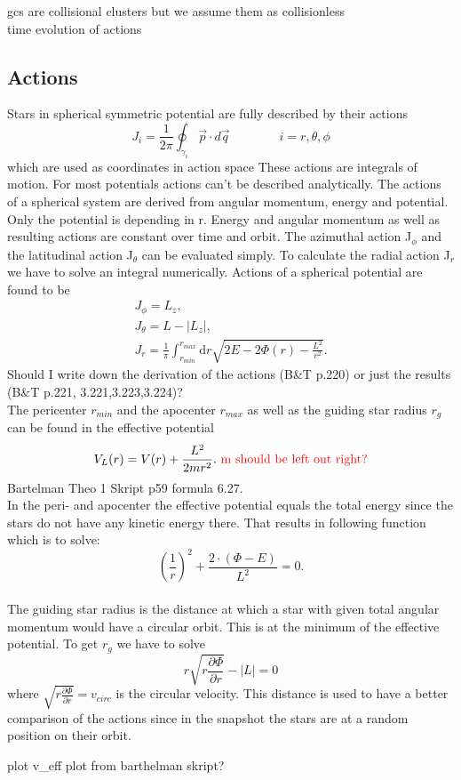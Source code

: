 \color{red} gcs are collisional clusters but we assume them as collisionless \\ time evolution of actions \color{black}


\subsection{Actions}
Stars in spherical symmetric potential are fully described by their actions \begin{equation}
J_i=\frac{1}{2\pi}\oint_{\gamma_i}\vec{p}\cdot d\vec{q} \qquad\qquad i=r,\theta,\phi
\end{equation} which are used as coordinates in action space
These actions are integrals of motion. For most potentials actions can't be described analytically. The actions of a spherical system are derived from angular momentum, energy and potential. Only the potential is depending in r. Energy and angular momentum as well as resulting actions are constant over time and orbit. The azimuthal action J\(_\phi\) and the latitudinal action J\(_\theta\) can be evaluated simply. To calculate the radial action J\(_r\) we have to solve an integral numerically. Actions of a spherical potential are found to be \begin{align}
J_\phi=L_z, \\ J_\theta=L-|L_z|, \\ J_r=\frac{1}{\pi} \int_{r_{min}}^{r_{max}} \mathrm{d}r \sqrt{2E-2\Phi(r)-\frac{L^2}{r^2}}.
\end{align}\color{red} Should I write down the derivation of the actions (B\&T p.220) or just the results (B\&T p.221, 3.221,3.223,3.224)?\color{black} \\ The pericenter \(r_{min}\) and the apocenter \(r_{max}\) as well as the guiding star radius \(r_g\) can be found in the effective potential \begin{equation}
V_L(r)=V(r)+\frac{L^2}{2mr^2}.\  \color{red} \mathrm{m\ should\ be\ left\ out\ right?} \color{black}
\end{equation} \color{red} Bartelman Theo 1 Skript p59 formula 6.27. \\ \color{black} In the peri- and apocenter the effective potential equals the total energy since the stars do not have any kinetic energy there. That results in following function which is to solve: \[\left(\frac{1}{r}\right)^2+\frac{2\cdot (\Phi-E)}{L^2}=0.\] \\ The guiding star radius is the distance at which a star with given total angular momentum would have a circular orbit. This is at the minimum of the effective potential. To get \(r_g\) we have to solve \[r\sqrt{r\frac{\partial\Phi}{\partial r}}-|L|=0\] where \(\sqrt{r\frac{\partial\Phi}{\partial r}}=v_{circ}\) is the circular velocity. This distance is used to have a better comparison of the actions since in the snapshot the stars are at a random position on their orbit.

\color{red} plot v\_eff plot from barthelman skript? \color{black}
